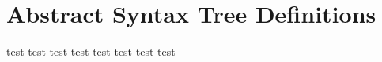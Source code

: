 \newpage
\section{Abstract Syntax Tree Definitions}

\begin{listing}[breakable]
test
test
test
test
test
test
test
test
\end{listing}